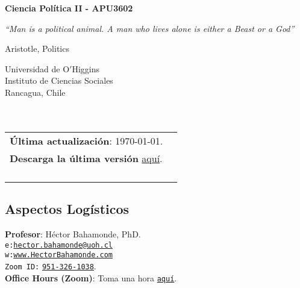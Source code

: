 \documentclass[letterpaper]{article}
\def\name{Ciencia Pol\'itica II - APU3602}
\begin{document}

\centerline{\huge \bf \name}

\epigraph{\emph{``Man is a political animal. A man who lives alone is either a Beast or a God''}}{Aristotle, Politics}


\vspace{0.25in}

\begin{minipage}{0.45\linewidth}
 Universidad de O$'$Higgins \\
  Instituto de Ciencias Sociales \\
  Rancagua, Chile\\
  \\
  \\

\end{minipage}
\hspace{4cm}\begin{minipage}{0.45\linewidth}
  \begin{tabular}{ll}
{\bf \'Ultima actualizaci\'on}: \today. \\
 {\bf Descarga la \'ultima versi\'on} \href{https://github.com/hbahamonde/Ciencia_Politica_II/raw/master/Bahamonde_Ciencia_Politica_II.pdf}{aqu\'i}.%
    \\
    \\
    \\
    \\
    \\
  \end{tabular}
\end{minipage}



\subsection*{Aspectos Log\'isticos}


\vspace{1mm}
{\bf Profesor}: H\'ector Bahamonde, PhD.\\
\texttt{e:}\href{mailto:hector.bahamonde@uoh.cl}{\texttt{hector.bahamonde@uoh.cl}}\\
\texttt{w:}\href{http://www.hectorbahamonde.com}{\texttt{www.HectorBahamonde.com}}\\
\texttt{Zoom ID:} \href{https://us02web.zoom.us/j/9513261038?pwd=S3BSWXQxZW11NC9CRjRoMmd0TkpEZz09}{\texttt{951-326-1038}}.\\
{\bf Office Hours (Zoom)}: Toma una hora \href{https://calendly.com/bahamonde/officehours}{\texttt{aqu\'i}}.
\end{document}
